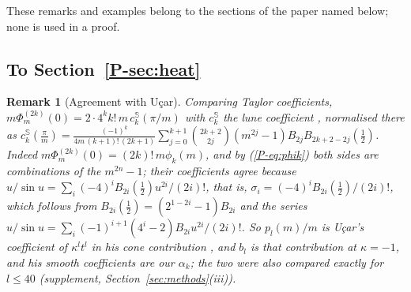 \documentclass[pdflatex,sn-mathphys-num]{sn-jnl}
\newcommand{\pref}[1]{\ref*{P-#1}}%
\theoremstyle{thmstyleone}%
\theoremstyle{thmstylethree}%
\newtheorem{remark}[proposition]{Remark}%
\begin{document}
These remarks and examples belong to the sections of the paper named below; none is used in a proof.

\subsection*{To Section~\pref{sec:heat}}

\begin{remark}[Agreement with U\c{c}ar]\label{rem:ucaragree}\label{rem:proofC}
Comparing Taylor coefficients, $m\Phi_m^{(2k)}(0)=2\cdot4^kk!\,m\,c^{\mathbb S}_k(\pi/m)$ with $c^{\mathbb S}_k$ the lune coefficient \cite[(4.25)]{ucar2017}, normalised there as $c^{\mathbb S}_k(\frac\pi m)=\frac{(-1)^k}{4m\,(k+1)!\,(2k+1)}\sum_{j=0}^{k+1}\binom{2k+2}{2j}(m^{2j}-1)B_{2j}B_{2k+2-2j}(\frac12)$. Indeed $m\Phi_m^{(2k)}(0)=(2k)!\,m\phi_k(m)$, and by (\pref{eq:phik}) both sides are combinations of the $m^{2n}-1$; their coefficients agree because $u/\sin u=\sum_i(-4)^iB_{2i}(\frac12)u^{2i}/(2i)!$, that is, $\sigma_i=(-4)^iB_{2i}(\frac12)/(2i)!$, which follows from $B_{2i}(\frac12)=(2^{1-2i}-1)B_{2i}$ and the series $u/\sin u=\sum_i(-1)^{i+1}(4^i-2)B_{2i}u^{2i}/(2i)!$. So $p_l(m)/m$ is U\c{c}ar's coefficient of $\kappa^lt^l$ in his cone contribution \cite[Cor.~4.19(ii), (4.33)--(4.34); Thm~4.20]{ucar2017}, and $b_l$ is that contribution at $\kappa=-1$, and his smooth coefficients \cite[(4.35)]{ucar2017} are our $\alpha_k$; the two were also compared exactly for $l\le40$ (supplement, Section~\ref{sec:methods}(iii)).
\end{remark}
\end{document}
